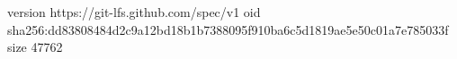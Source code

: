 version https://git-lfs.github.com/spec/v1
oid sha256:dd83808484d2c9a12bd18b1b7388095f910ba6c5d1819ae5e50c01a7e785033f
size 47762
